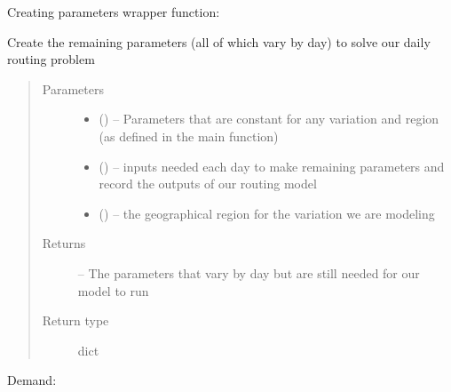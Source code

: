 \documentclass[letterpaper,10pt,english]{sphinxmanual}
\begin{document}
Creating parameters wrapper function:

\begin{fulllineitems}
\label{\detokenize{daily-routing:parameters.make_parameters}}
Create the remaining parameters (all of which vary by day) to solve
our daily routing problem
\begin{quote}\begin{description}
\item[{Parameters}] \leavevmode\begin{itemize}
\item {} 
 () -- Parameters that are constant for any variation and region (as defined
in the main function)

\item {} 
 () -- inputs needed each day to make remaining parameters and record the
outputs of our routing model

\item {} 
 () -- the geographical region for the variation we are modeling

\end{itemize}

\item[{Returns}] \leavevmode
{} -- The parameters that vary by day but are still needed for our model
to run

\item[{Return type}] \leavevmode
dict

\end{description}\end{quote}

\end{fulllineitems}


Demand:
\end{document}
